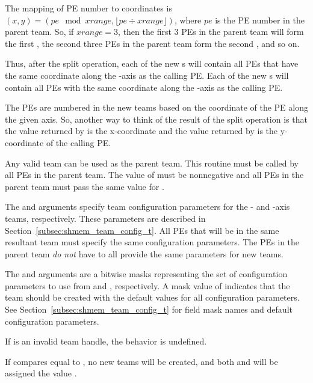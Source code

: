 \begin{apidefinition}
{The mapping of \ac{PE} number to coordinates is $(x, y) = ( pe \mod xrange, \lfloor pe \div xrange \rfloor )$,
where $pe$ is the \ac{PE} number in the parent team. So, if $xrange = 3$,
then the first 3 \acp{PE} in the parent team will form the first
, the second three \acp{PE} in the parent team form the second ,
and so on.

Thus, after the split operation, each of the new s will contain all \acp{PE} that
have the same coordinate along the -axis as the calling \ac{PE}. Each of the
new s will contain all \acp{PE} with the same coordinate along the
-axis as the calling \ac{PE}.

The \acp{PE} are numbered in the new teams based on the coordinate of the
\ac{PE} along the given axis. So, another way to think of the result of the split
operation is that the value returned by  is the
x-coordinate and the value returned by 
is the y-coordinate of the calling \ac{PE}.

Any valid \openshmem team can be used as the parent team. This routine must be
called by all \acp{PE} in the parent team. The value of  must be
nonnegative and all \acp{PE} in the parent team must pass the same value for
.

The  and  arguments specify team
configuration parameters for the - and -axis teams, respectively.
These parameters are described in Section~\ref{subsec:shmem_team_config_t}.
All \acp{PE} that will be in the same resultant team must specify the same
configuration parameters.
The \acp{PE} in the parent team \emph{do not} have to all provide the same
parameters for new teams.

The  and  arguments are a bitwise masks
representing the set of configuration parameters to use from
 and , respectively.
A mask value of  indicates that the team
should be created with the default values for all configuration parameters.
See Section~\ref{subsec:shmem_team_config_t} for field mask names and
default configuration parameters.

If  is an invalid team handle, the behavior is undefined.

If  compares equal to , no new
teams will be created, and both  and 
will be assigned the value .

}
\end{apidefinition}
